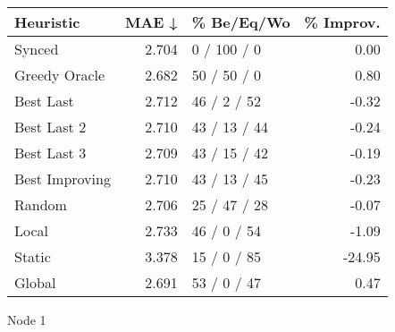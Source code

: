 \begin{tabular}{lrlr}
\toprule
\textbf{Heuristic} & \textbf{MAE ↓} & \textbf{\% Be/Eq/Wo} & \textbf{\% Improv.} \\
\midrule
            Synced &          2.704 &          0 / 100 / 0 &                0.00 \\
     Greedy Oracle &          2.682 &          50 / 50 / 0 &                0.80 \\
         Best Last &          2.712 &          46 / 2 / 52 &               -0.32 \\
       Best Last 2 &          2.710 &         43 / 13 / 44 &               -0.24 \\
       Best Last 3 &          2.709 &         43 / 15 / 42 &               -0.19 \\
    Best Improving &          2.710 &         43 / 13 / 45 &               -0.23 \\
            Random &          2.706 &         25 / 47 / 28 &               -0.07 \\
             Local &          2.733 &          46 / 0 / 54 &               -1.09 \\
            Static &          3.378 &          15 / 0 / 85 &              -24.95 \\
            Global &          2.691 &          53 / 0 / 47 &                0.47 \\
\bottomrule
\end{tabular}
\caption{Node 1}
\label{tab:hr_iid_lr01_le1_bs4_1}

